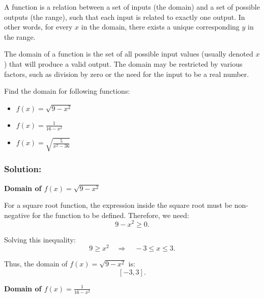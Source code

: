 \begin{definition}[Function]

A function is a relation between a set of inputs (the domain) and a set of possible outputs (the range), such that each input is related to exactly one output. In other words, for every \( x \) in the domain, there exists a unique corresponding \( y \) in the range.

\end{definition}



\begin{definition}

The domain of a function is the set of all possible input values (usually denoted \( x \)) that will produce a valid output. The domain may be restricted by various factors, such as division by zero or the need for the input to be a real number.
\end{definition}

\begin{example}


Find the domain for following functions: 
\begin{itemize}
\item \( f(x) = \sqrt{9 - x^2}\)
\item \( f(x) = \frac{1}{16 - x^2}\) 
\item \( f(x) = \sqrt{\frac{5}{x^2 - 36}}\) 
\end{itemize}

\end{example}

\subsubsection*{Solution:}


\textbf{Domain of \( f(x) = \sqrt{9 - x^2} \)}

For a square root function, the expression inside the square root must be non-negative for the function to be defined. Therefore, we need:
\[
9 - x^2 \geq 0.
\]

Solving this inequality:
\[
9 \geq x^2 \quad \Rightarrow \quad -3 \leq x \leq 3.
\]

Thus, the domain of \( f(x) = \sqrt{9 - x^2} \) is:
\[
\boxed{[-3, 3]}.
\]

\textbf{Domain of \( f(x) = \frac{1}{16 - x^2} \)}

